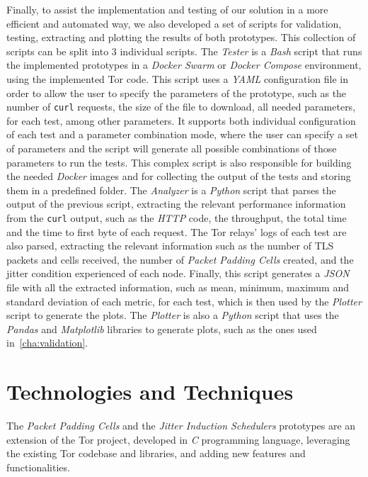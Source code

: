Finally, to assist the implementation and testing of our solution in a more efficient and automated way, we also developed a set of scripts for validation, testing, extracting and plotting the results of both prototypes.  
This collection of scripts can be split into 3 individual scripts.
The \textit{Tester} is a \textit{Bash} script that runs the implemented prototypes in a \textit{Docker Swarm} or \textit{Docker Compose} environment, using the implemented Tor code. This script uses a \textit{YAML} configuration file in order to allow the user to specify the parameters of the prototype, such as the number of \texttt{curl} requests, the size of the file to download, all needed parameters, for each test, among other parameters. It supports both individual configuration of each test and a parameter combination mode, where the user can specify a set of parameters and the script will generate all possible combinations of those parameters to run the tests. This complex script is also responsible for building the needed \textit{Docker} images and for collecting the output of the tests and storing them in a predefined folder.
The \textit{Analyzer} is a \textit{Python} script that parses the output of the previous script, extracting the relevant performance information from the \texttt{curl} output, such as the \textit{HTTP} code, the throughput, the total time and the time to first byte of each request. The Tor relays' logs of each test are also parsed, extracting the relevant information such as the number of TLS packets and cells received, the number of \textit{Packet Padding Cells} created, and the jitter condition experienced of each node. Finally, this script generates a \textit{JSON} file with all the extracted information, such as mean, minimum, maximum and standard deviation of each metric, for each test, which is then used by the \textit{Plotter} script to generate the plots.
The \textit{Plotter} is also a \textit{Python} script that uses the \textit{Pandas} and \textit{Matplotlib} libraries to generate plots, such as the ones used in~\cref{cha:validation}. 


\section{Technologies and Techniques}\label{sec:technologies_and_techniques}

The \textit{Packet Padding Cells} and the \textit{Jitter Induction Schedulers} prototypes are an extension of the Tor project, developed in \textit{C} programming language, leveraging the existing Tor codebase and libraries, and adding new features and functionalities.


